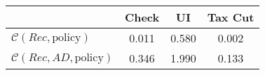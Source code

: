 \begin{tabular}{@{}lccc@{}} 
\toprule 
                          & Check      & UI    & Tax Cut    \\  \midrule 
$\mathcal{C}(Rec,\text{policy})$ & 0.011  & 0.580  & 0.002     \\ 
$\mathcal{C}(Rec, AD,\text{policy})$ & 0.346  & 1.990  & 0.133     \\ 
\end{tabular}  
